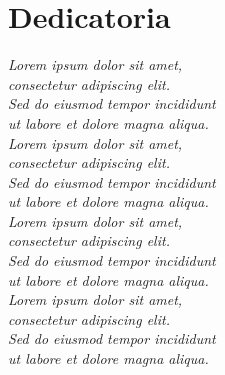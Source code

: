 \chapter*{Dedicatoria}
\ApplyDedicatoriaPageStyle
\vspace*{2.5cm}
\begin{center}
   \hfill \emph{Lorem ipsum dolor sit amet, \\\hfill consectetur adipiscing elit. \\\hfill Sed do eiusmod tempor incididunt \\\hfill ut labore et dolore magna aliqua.\\
   \vspace*{2cm}\hfill
   Lorem ipsum dolor sit amet, \\\hfill consectetur adipiscing elit. \\\hfill Sed do eiusmod tempor incididunt \\\hfill ut labore et dolore magna aliqua.\\
   \vspace*{2cm}\hfill
   Lorem ipsum dolor sit amet, \\\hfill consectetur adipiscing elit. \\\hfill Sed do eiusmod tempor incididunt \\\hfill ut labore et dolore magna aliqua.\\
\vspace*{2cm}\hfill
Lorem ipsum dolor sit amet, \\\hfill consectetur adipiscing elit. \\\hfill Sed do eiusmod tempor incididunt \\\hfill ut labore et dolore magna aliqua.\\}
\end{center}
